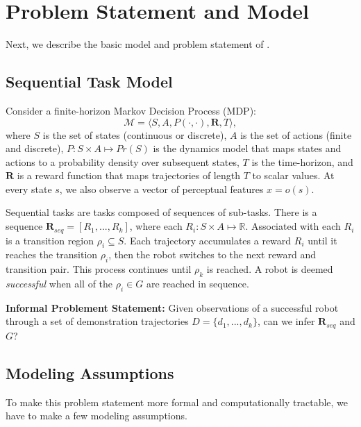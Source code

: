 \section{Problem Statement and Model}
Next, we describe the basic model and problem statement of \hirl.

\subsection{Sequential Task Model}
Consider a finite-horizon Markov Decision Process (MDP): \[\mathcal{M} = \langle S,A,P(\cdot,\cdot),\mathbf{R},T \rangle,\] where $S$ is the set of states (continuous or discrete), $A$ is the set of actions (finite and discrete), $P: S \times A \mapsto Pr(S)$ is the dynamics model that maps states and actions to a probability density over subsequent states, $T$ is the time-horizon, and $\mathbf{R}$ is a reward function that maps trajectories of length $T$ to scalar values. At every state $s$, we also observe a vector of perceptual features $x = o(s)$. 

Sequential tasks are tasks composed of sequences of sub-tasks. There is a sequence $\mathbf{R}_{seq}=[R_1,...,R_k]$, where each $R_i: S \times A \mapsto \mathbb{R}$. Associated with each $R_i$ is a transition region $\rho_i \subseteq S$. 
Each trajectory accumulates a reward $R_i$ until it reaches the transition $\rho_i$, then the robot switches to the next reward and transition pair.
This process continues until $\rho_k$ is reached.
A robot is deemed \emph{successful} when all of the $\rho_i \in G$ are reached in sequence.

\noindent \textbf{Informal Problement Statement: } Given observations of a successful robot through a set of demonstration trajectories $D = \{d_1,...,d_k\}$, can we infer $\mathbf{R}_{seq}$ and $G$?

\subsection{Modeling Assumptions}
To make this problem statement more formal and computationally tractable, we have to make a few modeling assumptions.

